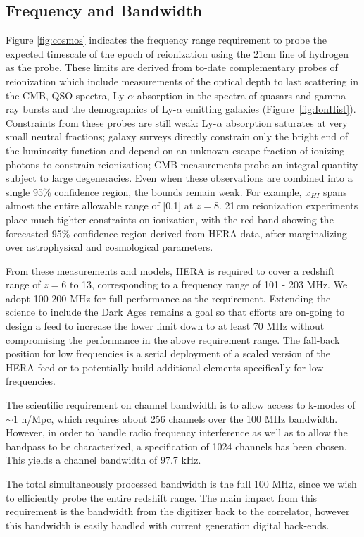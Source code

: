 \documentclass[preprint,11pt]{aastex}
\begin{document}
\subsection{Frequency and Bandwidth}
\label{sec:freqs}
Figure \ref{fig:cosmos} indicates the frequency range requirement to probe the expected timescale of the epoch of reionization using the 21cm line of hydrogen as the probe.  
These limits are derived from to-date complementary probes of reionization which include measurements of
the optical depth to last scattering in the CMB, QSO spectra, Ly-$\alpha$
absorption in the spectra of quasars and gamma ray bursts and the demographics
of Ly-$\alpha$ emitting galaxies
(Figure~\ref{fig:IonHist}). 
Constraints from these probes are still weak:
Ly-$\alpha$ absorption saturates at very small neutral fractions; galaxy
surveys directly constrain only the bright end of the luminosity function and
depend on an unknown escape fraction of ionizing photons to constrain
reionization; CMB measurements probe an integral quantity subject
to large degeneracies. Even when these observations are
combined into a single 95\% confidence region, the bounds remain weak.
For example, $x_{HI}$ spans almost the entire allowable range of [0,1]
at $z=8$. 21\,cm reionization experiments place much tighter constraints on ionization, with the
red band showing the forecasted 95\% confidence region derived from HERA data,
after marginalizing over astrophysical and cosmological parameters.

From these measurements and models, HERA is required to cover a redshift range of $z=$6 to 13, corresponding to a frequency range of 101 - 203 MHz.  We adopt 100-200 MHz for full performance as the requirement.  Extending the science to include the Dark Ages remains a goal so that efforts are on-going to design a feed to increase the lower limit down to at least 70 MHz without compromising the performance in the above requirement range.  The fall-back position for low frequencies is a serial deployment of a scaled version of the HERA feed or to potentially build additional elements specifically for low frequencies.  

The scientific requirement on channel bandwidth is to allow access to k-modes of $\sim1$ h/Mpc, which requires about 256 channels over the 100 MHz bandwidth.  However, in order to handle radio frequency interference as well as to allow the bandpass to be characterized, a specification of 1024 channels has been chosen.  This yields a channel bandwidth of 97.7 kHz.

The total simultaneously processed bandwidth is the full 100 MHz, since we wish to efficiently probe the entire redshift range.  The main impact from this requirement is the bandwidth from the digitizer back to the correlator, however this bandwidth is easily handled with current generation digital back-ends.
\end{document}
